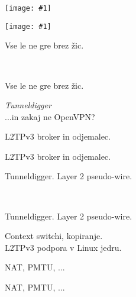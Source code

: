 \documentclass[]{beamer}
\newcommand{\ifstrempty}[3]{%
\def\reallyempty{}%
\def\ifarg{#1}%
\ifx\ifarg\reallyempty%
{#2}
\else
{#3}
\fi%
}
\newcommand{\wrapframe}[1]{
\begin{frame}
 #1
\end{frame}
}
\newenvironment{changemargin}[2]{%
\begin{list}{}{%
\setlength{\topsep}{0pt}%
\setlength{\leftmargin}{#1}%
\setlength{\rightmargin}{#2}%
\setlength{\listparindent}{\parindent}%
\setlength{\itemindent}{\parindent}%
\setlength{\parsep}{\parskip}%
}%
\item[]}{\end{list}}
\newcommand{\simpleslide}[3]{\wrapframe{
\ifstrempty{#1}{\vbox{ \ } 

}{
{\footnotesize #1}
} \vfill

\begin{center}
#2
\end{center}
\vfill
\ifstrempty{#3}{ \ }{
\begin{flushright}
{\footnotesize #3}
\end{flushright}
}
}}
\newcommand{\fullslideimage}[1]{
\begin{frame}[plain]
\begin{changemargin}{-1cm}{-1cm}
\begin{center}
\texttt{[image: \#1]}
\end{center}
\end{changemargin}
\end{frame}
}
\begin{document}
\fullslideimage{images/datastream-counter-reset.pdf}

\fullslideimage{images/implementation-interactive-visualization.png}

\simpleslide{Vse le ne gre brez žic.}{{\huge \textit{Tunneldigger}} \\ {...in zakaj ne OpenVPN?}}{L2TPv3 broker in odjemalec.}


\simpleslide{Tunneldigger. Layer 2 pseudo-wire.}{Context switchi, kopiranje. \\ L2TPv3 podpora v Linux jedru.}{NAT, PMTU, ...}

\subtitle{https://wlan-si.net \\ jernej@kos.mx}
\date[]{}

\maketitle
\end{document}
